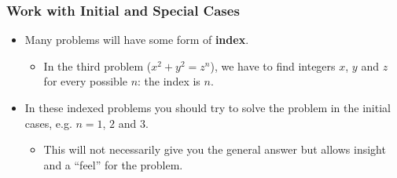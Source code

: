\documentclass{beamer}
\begin{document}
\begin{frame}%
\frametitle{Work with Initial and Special Cases}

\begin{itemize}
\item Many problems will have some form of \textbf{index}.\\
\begin{itemize}
\item<1-> In the third problem ($x^2 + y^2 = z^n$), we have to find integers $x$, $y$ and $z$ for every possible $n$: the index is $n$.
\end{itemize}

\vspace{0.5cm}

\item<2-> In these indexed problems you should try to solve the problem in the initial cases, e.g.
$n = 1$, $2$ and $3$.
\begin{itemize}
\item<2-> This will not necessarily give you the general answer but allows insight
and a ``feel'' for the problem.
\end{itemize}
\end{itemize}


\end{frame}
\end{document}
